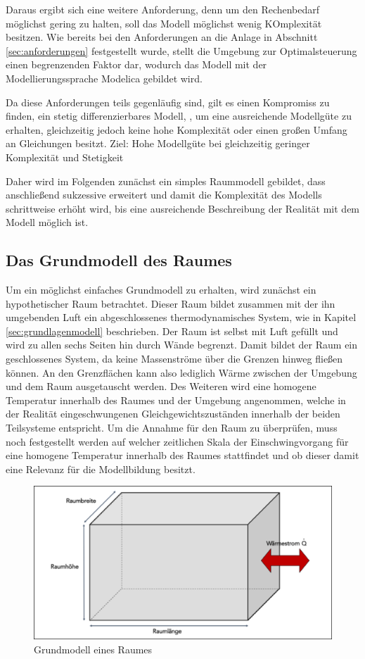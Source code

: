 Daraus ergibt sich eine weitere Anforderung, denn um den Rechenbedarf möglichst gering zu halten, soll das Modell möglichst wenig KOmplexität besitzen.
Wie bereits bei den Anforderungen an die Anlage in Abschnitt \ref{sec:anforderungen} festgestellt wurde, stellt die Umgebung zur Optimalsteuerung einen begrenzenden Faktor dar, wodurch das Modell mit der Modellierungssprache Modelica gebildet wird.

Da diese Anforderungen teils gegenläufig sind, gilt es einen Kompromiss zu finden, ein stetig differenzierbares Modell,
, um eine ausreichende Modellgüte zu erhalten, gleichzeitig jedoch keine hohe Komplexität oder einen großen Umfang an Gleichungen besitzt.
Ziel: Hohe Modellgüte bei gleichzeitig geringer Komplexität und Stetigkeit

Daher wird im Folgenden zunächst ein simples Raummodell gebildet, dass anschließend sukzessive erweitert und damit die Komplexität des Modells schrittweise erhöht wird, bis eine ausreichende Beschreibung der Realität mit dem Modell möglich ist.

\subsection{Das Grundmodell des Raumes}

Um ein möglichst einfaches Grundmodell zu erhalten, wird zunächst ein hypothetischer Raum betrachtet. Dieser Raum bildet zusammen mit der ihn umgebenden Luft ein abgeschlossenes thermodynamisches System, wie in Kapitel \ref{sec:grundlagenmodell} beschrieben. Der Raum ist selbst mit Luft gefüllt und wird zu allen sechs Seiten hin durch Wände begrenzt. Damit bildet der Raum ein geschlossenes System, da keine Massenströme über die Grenzen hinweg fließen können. An den Grenzflächen kann also lediglich Wärme zwischen der Umgebung und dem  Raum ausgetauscht werden. Des Weiteren wird eine homogene Temperatur innerhalb des Raumes und der Umgebung angenommen, welche in der Realität eingeschwungenen Gleichgewichtszuständen innerhalb der beiden Teilsysteme entspricht. Um die Annahme für den Raum zu überprüfen, muss noch festgestellt werden auf welcher zeitlichen Skala der Einschwingvorgang für eine homogene Temperatur innerhalb des Raumes stattfindet und ob dieser damit eine Relevanz für die Modellbildung besitzt.

\begin{figure}
\centering
\includegraphics[width=\textwidth]{abbildungen/20160316_grundraum}
\caption{Grundmodell eines Raumes}
\label{fig:grundraum}
\end{figure}

